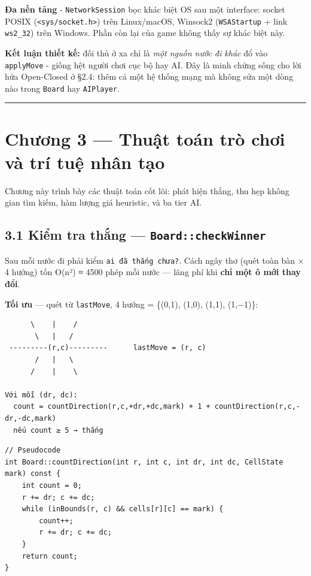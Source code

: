 \documentclass[11pt,a4paper]{article}
\begin{document}
\textbf{Đa nền tảng} - \texttt{NetworkSession} bọc khác biệt OS sau một interface: socket POSIX (\texttt{<sys/socket.h>}) trên Linux/macOS, Winsock2 (\texttt{WSAStartup} + link \texttt{ws2\_32}) trên Windows. Phần còn lại của game không thấy sự khác biệt này.

\textbf{Kết luận thiết kế:} đối thủ ở xa chỉ là \emph{một nguồn nước đi khác} đổ vào \texttt{applyMove} - giống hệt người chơi cục bộ hay AI. Đây là minh chứng sống cho lời hứa Open-Closed ở §2.4: thêm cả một hệ thống mạng mà không sửa một dòng nào trong \texttt{Board} hay \texttt{AIPlayer}.

\noindent\rule{\textwidth}{0.5pt}
\section{Chương 3 — Thuật toán trò chơi và trí tuệ nhân tạo}
\label{sec:org33f6013}

Chương này trình bày các thuật toán cốt lõi: phát hiện thắng, thu hẹp không gian tìm kiếm, hàm lượng giá heuristic, và ba tier AI.
\subsection{3.1 Kiểm tra thắng — \texttt{Board::checkWinner}}
\label{sec:org0b1f2b5}

Sau mỗi nước đi phải kiểm \texttt{ai đã thắng chưa?}. Cách ngây thơ (quét toàn bàn × 4 hướng) tốn O(n²) ≈ 4500 phép mỗi nước — lãng phí khi \textbf{chỉ một ô mới thay đổi}.

\textbf{Tối ưu} — quét từ \texttt{lastMove}, 4 hướng = \{(0,1), (1,0), (1,1), (1,−1)\}:

\begin{verbatim}
      \    |    /
       \   |   /
 ---------(r,c)---------      lastMove = (r, c)
       /   |   \
      /    |    \

Với mỗi (dr, dc):
  count = countDirection(r,c,+dr,+dc,mark) + 1 + countDirection(r,c,-dr,-dc,mark)
  nếu count ≥ 5 → thắng
\end{verbatim}

\begin{verbatim}
// Pseudocode
int Board::countDirection(int r, int c, int dr, int dc, CellState mark) const {
    int count = 0;
    r += dr; c += dc;
    while (inBounds(r, c) && cells[r][c] == mark) {
        count++;
        r += dr; c += dc;
    }
    return count;
}
\end{verbatim}
\end{document}
